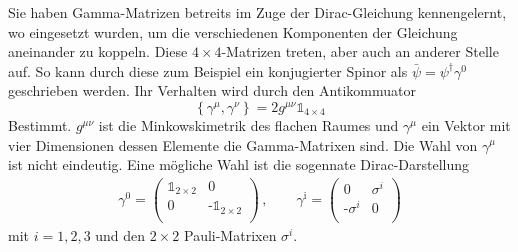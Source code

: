 \documentclass{exercise}
\begin{document}

Sie haben Gamma-Matrizen betreits im Zuge der Dirac-Gleichung kennengelernt, wo eingesetzt wurden, um die verschiedenen Komponenten der Gleichung aneinander zu koppeln.
Diese $4 \times 4$-Matrizen treten, aber auch an anderer Stelle auf. 
So kann durch diese zum Beispiel ein konjugierter Spinor als $\bar{\psi} = \psi^\dagger \gamma^0$ geschrieben werden.
Ihr Verhalten wird durch den Antikommuator
\begin{equation}
    \label{eq:AntiKom}
    \left\{\gamma^\mu, \gamma^\nu \right\} = 2 g^{\mu \nu} \mathbb{1}_{4 \times 4}
\end{equation}
Bestimmt. 
$g^{\mu \nu}$ ist die Minkowskimetrik des flachen Raumes und $\gamma^\mu $ ein Vektor mit vier Dimensionen dessen Elemente die Gamma-Matrixen sind.
Die Wahl von $\gamma^\mu$ ist nicht eindeutig.
Eine mögliche Wahl ist die sogennate Dirac-Darstellung
\begin{align}
    \label{Gamma}
    \gamma^0 =   \begin{pmatrix}
                \mathbb{1}_{2 \times 2} & 0 \\
                0 & \text{-}\mathbb{1}_{2 \times 2} \\
    \end{pmatrix}\,, \qquad
    \gamma^\text{i} =   \begin{pmatrix}
        0 & \sigma^i \\
       \text{-} \sigma^i & 0 \\
    \end{pmatrix}
\end{align} 
mit $i = 1, 2, 3$ und den $2\times2$ Pauli-Matrixen $\sigma^i$.
\end{document}
